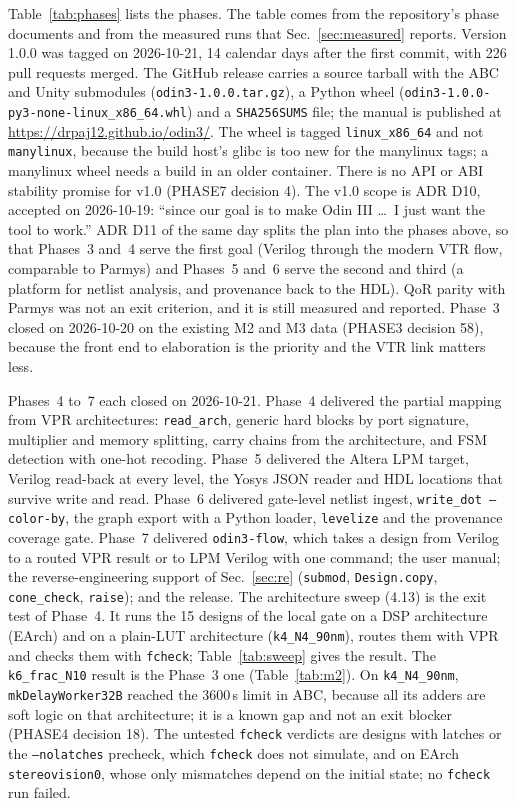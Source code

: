 \documentclass[conference]{IEEEtran}
\newcommand{\code}[1]{\texttt{#1}}
\begin{document}
Table~\ref{tab:phases} lists the phases. The table comes from the repository's phase
documents and from the measured runs that Sec.~\ref{sec:measured} reports. Version 1.0.0 was
tagged on 2026-10-21, 14 calendar days after the first commit, with 226 pull requests merged. The
GitHub release carries a source tarball with the ABC and Unity submodules
(\code{odin3-1.0.0.tar.gz}), a Python wheel (\code{odin3-1.0.0-py3-none-linux\_x86\_64.whl}) and
a \code{SHA256SUMS} file; the manual is published at \url{https://drpaj12.github.io/odin3/}. The
wheel is tagged \code{linux\_x86\_64} and not \code{manylinux}, because the build host's glibc
is too new for the manylinux tags; a manylinux wheel needs a build in an older container. There
is no API or ABI stability promise for v1.0 (PHASE7 decision 4). The v1.0 scope is ADR D10,
accepted on 2026-10-19: ``since our goal is to make Odin III \ldots\ I just want the tool to
work.'' ADR D11 of the same day splits the plan into the phases above, so that Phases~3 and~4
serve the first goal (Verilog through the modern VTR flow, comparable to Parmys) and Phases~5
and~6 serve the second and third (a platform for netlist analysis, and provenance back to the
HDL). QoR parity with Parmys was not an exit criterion, and it is still measured and reported.
Phase~3 closed on 2026-10-20 on the existing M2 and M3 data (PHASE3 decision 58), because the
front end to elaboration is the priority and the VTR link matters less.

Phases~4 to~7 each closed on 2026-10-21. Phase~4 delivered the partial mapping from VPR
architectures: \code{read\_arch}, generic hard blocks by port signature, multiplier and memory
splitting, carry chains from the architecture, and FSM detection with one-hot recoding.
Phase~5 delivered the Altera LPM target, Verilog read-back at every level, the Yosys JSON reader
and HDL locations that survive write and read. Phase~6 delivered gate-level netlist ingest,
\code{write\_dot --color-by}, the graph export with a Python loader, \code{levelize} and the
provenance coverage gate. Phase~7 delivered \code{odin3-flow}, which takes a design from Verilog
to a routed VPR result or to LPM Verilog with one command; the user manual; the
reverse-engineering support of Sec.~\ref{sec:re} (\code{submod}, \code{Design.copy},
\code{cone\_check}, \code{raise}); and the release. The architecture sweep (4.13) is the exit
test of Phase~4. It runs the 15 designs of the local gate on a DSP architecture (EArch) and on a
plain-LUT architecture (\code{k4\_N4\_90nm}), routes them with VPR and checks them with
\code{fcheck}; Table~\ref{tab:sweep} gives the result. The \code{k6\_frac\_N10} result is the
Phase~3 one (Table~\ref{tab:m2}). On \code{k4\_N4\_90nm}, \code{mkDelayWorker32B} reached the
3600\,s limit in ABC, because all its adders are soft logic on that architecture; it is a
known gap and not an exit blocker (PHASE4 decision 18). The untested \code{fcheck} verdicts
are designs with latches or the \code{--nolatches} precheck, which \code{fcheck} does not
simulate, and on EArch \code{stereovision0}, whose only mismatches depend on the initial state;
no \code{fcheck} run failed.
\end{document}
